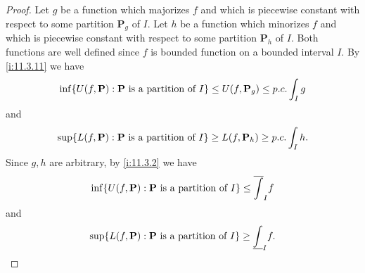 \begin{proof}
  Let \(g\) be a function which majorizes \(f\) and which is piecewise constant with respect to some partition \(\mathbf{P}_g\) of \(I\).
  Let \(h\) be a function which minorizes \(f\) and which is piecewise constant with respect to some partition \(\mathbf{P}_h\) of \(I\).
  Both functions are well defined since \(f\) is bounded function on a bounded interval \(I\).
  By \cref{i:11.3.11} we have
  \[
    \inf\set{U(f, \mathbf{P}) : \mathbf{P} \text{ is a partition of } I} \leq U(f, \mathbf{P}_g) \leq p.c. \int_I g
  \]
  and
  \[
    \sup\set{L(f, \mathbf{P}) : \mathbf{P} \text{ is a partition of } I} \geq L(f, \mathbf{P}_h) \geq p.c. \int_I h.
  \]
  Since \(g, h\) are arbitrary, by \cref{i:11.3.2} we have
  \[
    \inf\set{U(f, \mathbf{P}) : \mathbf{P} \text{ is a partition of } I} \leq \overline{\int}_I f
  \]
  and
  \[
    \sup\set{L(f, \mathbf{P}) : \mathbf{P} \text{ is a partition of } I} \geq \underline{\int}_I f.
  \]


\end{proof}
